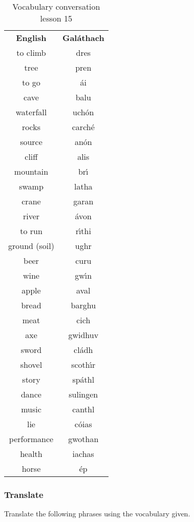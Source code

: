 \begin{table}[H]
\centering
\begin{tabular}{cc}
  \toprule
  \textbf{English} & \textbf{Gal\'{a}thach}\\
  \cmidrule(lr){1-1}\cmidrule(lr){2-2}
  to climb & dres\\
  tree & pren\\
  to go & \'{a}i\\
  cave & balu\\
  waterfall & uch\'{o}n\\
  rocks & carch\'{e}\\
  source & an\'{o}n\\
  cliff & alis\\
  mountain & br\'{\i}\\
  swamp & latha\\
  crane & garan\\
  river & \'{a}von\\
  to run & r\'{\i}thi\\
  ground (soil) & ughr\\
  beer & curu\\
  wine & gw\'{\i}n\\
  apple & aval\\
  bread & barghu\\
  meat & cich\\
  axe & gwidhuv\\
  sword & cl\'{a}dh\\
  shovel & scoth\'{\i}r\\
  story & sp\'{a}thl\\
  dance & sulingen\\
  music & canthl\\
  lie & c\'{o}ias\\
  performance & gwothan\\
  health & iachas\\
  horse & \'{e}p\\
  \bottomrule
\end{tabular}
\label{vocab_conversation_lesson15}
\caption{Vocabulary conversation lesson 15}
\end{table}

\subsubsection{Translate}

Translate the following phrases using the vocabulary given.

